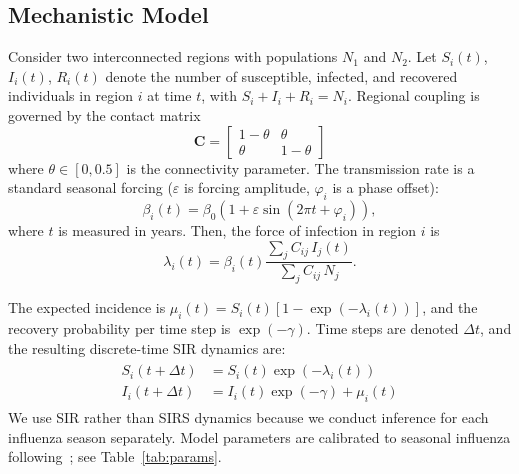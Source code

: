\documentclass[9pt,twocolumn,twoside]{pnas-new}
\begin{document}
{\subsection*{Mechanistic Model}\label{subsec:model}
Consider two interconnected regions with populations $N_1$ and $N_2$.
Let $S_i(t)$, $I_i(t)$, $R_i(t)$ denote the number of susceptible,
infected, and recovered individuals in region $i$ at time $t$, with
$S_i + I_i + R_i = N_i$. Regional coupling is governed by the contact
matrix
%
%
$$
\mathbf{C} =
\begin{bmatrix}
  1 - \theta  &     \theta \\
      \theta  & 1 - \theta
\end{bmatrix}
$$
%
%
where $\theta \in [0, 0.5]$ is the connectivity parameter. The
transmission rate is a standard seasonal forcing ($\varepsilon$ is forcing
amplitude, $\varphi_i$ is a phase offset):
%
%
$$
\beta_i(t) = \beta_0(1 + \varepsilon\sin(2\pi t + \varphi_i)),
$$
%
%
where $t$ is measured in years. Then, the force of infection in region
$i$ is~\citep{edlund2011, keeling2008}
\begin{equation}\label{eq:foi}
\lambda_i(t) = \beta_i(t) \frac{\sum_j C_{ij}\, I_j(t)}{\sum_j C_{ij}\, N_j}.
\end{equation}

The expected incidence is $\mu_i(t) = S_i(t)[1 -
  \exp(-\lambda_i(t))]$, and the recovery probability per time step is
$\exp(-\gamma)$. Time steps are denoted $\Delta t$, and the resulting
discrete-time SIR dynamics are:
\begin{align}\begin{split}\label{eq:discrete_sir}
S_i(t+\Delta t) &= S_i(t) \exp(-\lambda_i(t)) \\
I_i(t+ \Delta t) &= I_i(t) \exp(-\gamma) + \mu_i(t)
\end{split}\end{align}
We use SIR rather than SIRS dynamics because we conduct inference for
each influenza season separately. Model parameters are calibrated to
seasonal influenza following~\citep{shaman2010, rolfes2018}; see
Table~\ref{tab:params}.

}
\end{document}
